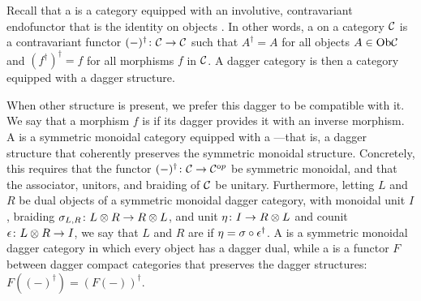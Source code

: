 Recall that a  is a category equipped with an
involutive, contravariant endofunctor that is the identity on objects
\cite{AC,Se}. In other words, a  on a category $\mathcal C$
is a contravariant functor $(-)^\dagger{\colon} \mathcal C \to \mathcal C$ such that
$A^\dagger = A$ for all objects $A \in \mathrm{Ob} \mathcal C$ and $(f^\dagger)^\dagger = f$
for all morphisms $f$ in $\mathcal C$.  A dagger category is then a category equipped
with a dagger structure.

When other structure is present, we prefer this dagger to be compatible with it.
We say that a morphism $f$ is  if its dagger provides it with an
inverse morphism. A  is a symmetric
monoidal category equipped with a ---that is, a dagger structure that coherently preserves the symmetric
monoidal structure. Concretely, this requires that the functor $(-)^\dagger{\colon}
\mathcal C \to \mathcal C^{\mathrm op}$ be symmetric monoidal, and that the associator,
unitors, and braiding of $\mathcal C$ be unitary. Furthermore, letting $L$ and $R$ be
dual objects of a symmetric monoidal dagger category, with monoidal unit $I$,
braiding $\sigma_{L,R}{\colon} L \otimes R \to R \otimes L$, and unit $\eta{\colon} I \to R
\otimes L$ and counit $\epsilon{\colon} L \otimes R \to I$, we say that $L$ and $R$ are
 if $\eta = \sigma \circ \epsilon^\dagger$.  A  is a symmetric monoidal dagger category in which every object
has a dagger dual, while a  is a functor $F$ between
dagger compact categories that preserves the dagger structures: $F((-)^\dagger)
= (F(-))^\dagger$.

